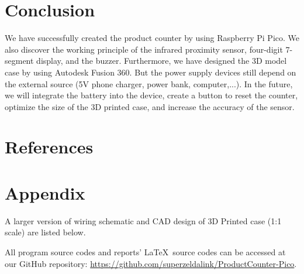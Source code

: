 \documentclass[a4paper,twoside]{report}
\begin{document}
\chapter{Conclusion}
We have successfully created the product counter by using Raspberry Pi Pico. We also discover the working principle of the infrared proximity sensor, four-digit 7-segment display, and the buzzer. Furthermore, we have designed the 3D model case by using Autodesk Fusion 360. But the power supply devices still depend on the external source (5V phone charger, power bank, computer,...). In the future, we will integrate the battery into the device, create a button to reset the counter, optimize the size of the 3D printed case, and increase the accuracy of the sensor. 

\chapter{References}
\AtNextBibliography{\large}
\setlength\bibitemsep{5pt}
\nocite{*}
\printbibliography[heading=none]

\chapter{Appendix}
A larger version of wiring schematic and CAD design of 3D Printed case (1:1 scale) are listed below.

All program source codes and reports' \LaTeX \ source codes can be accessed at our GitHub repository: \url{https://github.com/superzeldalink/ProductCounter-Pico}.

\begin{landscape}

\end{landscape}

\end{document}
